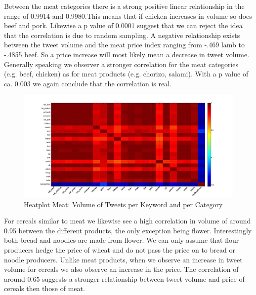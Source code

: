 Between the meat categories there is a strong positive linear relationship in the range of 0.9914 and 0.9980.This means that if chicken increases in volume so does beef and pork. Likewise a p value of 0.0001 suggest that we can reject the idea that the correlation is due to random sampling. A negative relationship exists between the tweet volume and the meat price index ranging from -.469 lamb to -.4855 beef. So a price increase will most likely mean a decrease in tweet volume. Generally speaking we observer a stronger correlation for the meat categories (e.g. beef, chicken) as for meat products (e.g. chorizo, salami). With a p value of ca. 0.003 we again conclude that the correlation is real. 


\begin{figure}[H]
        \centering
         \includegraphics[width=1\textwidth ]{img/anal/meat_heatplot_price}
              
        \caption{Heatplot Meat: Volume of Tweets per Keyword and per Category}
        \label{fig:distribution}
\end{figure}



For cereals similar to meat we likewise see a high correlation in volume of around 0.95 between the different products, the only exception being flower. Interestingly both bread and noodles are made from flower. We can only assume that flour producers hedge the price of wheat and do not pass the price on to bread or noodle producers. Unlike meat products, when we observe an increase in tweet volume for cereals we also observe an increase in the price. The correlation of around 0.65 suggests a stronger relationship between tweet volume and price of cereals then those of meat. 

